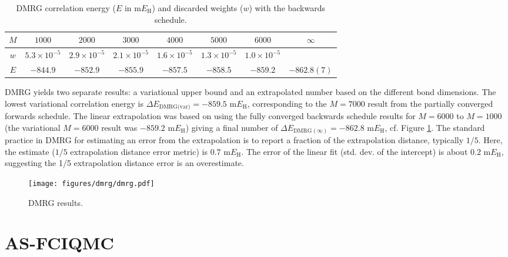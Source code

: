 \documentclass[journal=jcp,manuscript=suppinfo]{achemso}
\begin{document}
%
\begin{table}[ht]
\begin{center}
\caption{DMRG correlation energy ($E$ in m$E_{\text{H}}$) and discarded weights ($w$) with the backwards schedule.}
\label{tab:DMRG_reverse}
\begin{tabular}{cccccccc}
\toprule
$M$ & $1000$               & $2000$               & $3000$               & $4000$               & $5000$                & $6000$                & $\infty$    \\ \midrule\midrule
$w$ & $5.3 \times 10^{-5}$ & $2.9 \times 10^{-5}$ & $2.1 \times 10^{-5}$ & $1.6 \times 10^{-5}$ & $1.3 \times 10^{-5}$  & $1.0 \times 10^{-5}$  &             \\
$E$ & $-844.9$ 		   & $-852.9$  		  & $-855.9$ 		 & $-857.5$ 		& $-858.5$ 		& $-859.2$		& $-862.8(7)$ \\
\midrule
\end{tabular}
\vspace{-0.6cm}
\end{center}
\end{table}
%
DMRG yields two separate results: a variational upper bound and an extrapolated number based on the different bond dimensions. The lowest variational correlation energy is $\Delta E_{\text{DMRG(var)}} = -859.5$ m$E_{\text{H}}$, corresponding to the $M=7000$ result from the partially converged forwards schedule. The linear extrapolation was based on using the fully converged backwards schedule results for $M=6000$ to $M=1000$ (the variational $M=6000$ result was $-859.2$ m$E_{\text{H}}$) giving a final number of $\Delta E_{\text{DMRG}(\infty)} = -862.8$ m$E_{\text{H}}$, cf. Figure \ref{dmrg_SI_fig}. The standard practice in DMRG for estimating an error from the extrapolation is to report a fraction of the extrapolation distance, typically $1/5$. Here, the estimate ($1/5$ extrapolation distance error metric) is $0.7$ m$E_{\text{H}}$. The error of the linear fit (std. dev. of the intercept) is about $0.2$ m$E_{\text{H}}$, suggesting the 1/5 extrapolation distance error is an overestimate.
%
\begin{figure}[ht!]
\begin{center}
\texttt{[image: figures/dmrg/dmrg.pdf]}
\caption{DMRG results.}
\label{dmrg_SI_fig}
\end{center}
\end{figure}
%

\section{AS-FCIQMC}\label{as_fciqmc_SI_sect}
\end{document}
